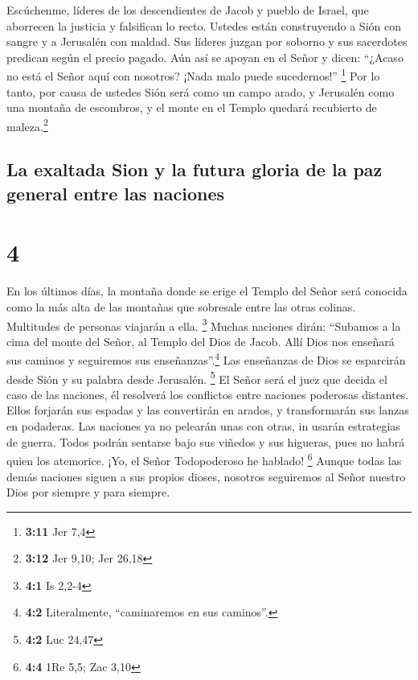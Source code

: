  Escúchenme, líderes de los descendientes de Jacob y
pueblo de Israel, que aborrecen la justicia y falsifican lo recto.
 Ustedes están construyendo a Sión con sangre y a
Jerusalén con maldad.  Sus líderes juzgan por soborno y
sus sacerdotes predican según el precio pagado. Aún así se apoyan en el
Señor y dicen: ``¿Acaso no está el Señor aquí con nosotros? ¡Nada malo
puede sucedernos!'' \footnote{\textbf{3:11} Jer 7,4}  Por
lo tanto, por causa de ustedes Sión será como un campo arado, y
Jerusalén como una montaña de escombros, y el monte en el Templo quedará
recubierto de maleza.\footnote{\textbf{3:12} Jer 9,10; Jer 26,18}

\hypertarget{la-exaltada-sion-y-la-futura-gloria-de-la-paz-general-entre-las-naciones}{%
\subsection{La exaltada Sion y la futura gloria de la paz general entre
las
naciones}\label{la-exaltada-sion-y-la-futura-gloria-de-la-paz-general-entre-las-naciones}}

\hypertarget{section-3}{%
\section{4}\label{section-3}}

 En los últimos días, la montaña donde se erige el Templo
del Señor será conocida como la más alta de las montañas que sobresale
entre las otras colinas. Multitudes de personas viajarán a ella.
\footnote{\textbf{4:1} Is 2,2-4}  Muchas naciones dirán:
``Subamos a la cima del monte del Señor, al Templo del Dios de Jacob.
Allí Dios nos enseñará sus caminos y seguiremos sus
enseñanzas''.\footnote{\textbf{4:2} Literalmente, ``caminaremos en sus
  caminos''.} Las enseñanzas de Dios se esparcirán desde Sión y su
palabra desde Jerusalén. \footnote{\textbf{4:2} Luc 24,47}
 El Señor será el juez que decida el caso de las naciones,
él resolverá los conflictos entre naciones poderosas distantes. Ellos
forjarán sus espadas y las convertirán en arados, y transformarán sus
lanzas en podaderas. Las naciones ya no pelearán unas con otras, in
usarán estrategias de guerra.  Todos podrán sentarse bajo
sus viñedos y sus higueras, pues no habrá quien los atemorice. ¡Yo, el
Señor Todopoderoso he hablado! \footnote{\textbf{4:4} 1Re 5,5; Zac 3,10}
 Aunque todas las demás naciones siguen a sus propios
dioses, nosotros seguiremos al Señor nuestro Dios por siempre y para
siempre.

